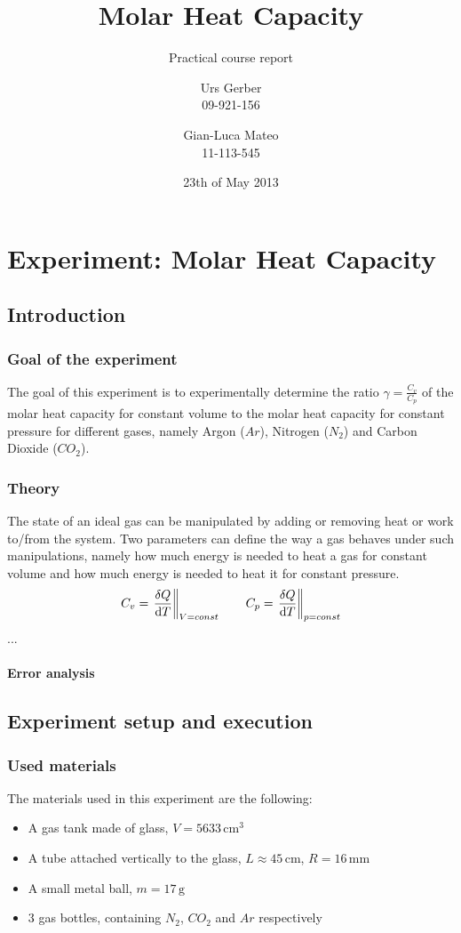 \documentclass{scrreprt}
\author{Urs Gerber\\09-921-156 \and Gian-Luca Mateo\\11-113-545}
\date{23th of May 2013}
\title{Molar Heat Capacity}
\subtitle{Practical course report}
\newcommand{\unit}[1]{\ensuremath{\, \mathrm{#1}}}
\begin{document}
\maketitle

\tableofcontents
\newpage

\chapter{Experiment: Molar Heat Capacity}
\section{Introduction}


\subsection{Goal of the experiment}
The goal of this experiment is to experimentally determine the ratio $\gamma = \frac{C_v}{C_p}$ of the molar heat capacity for constant volume to the molar heat capacity for constant pressure for different gases, namely Argon ($Ar$), Nitrogen ($N_2$) and Carbon Dioxide ($CO_2$). 
 
\subsection{Theory} 
The state of an ideal gas can be manipulated by adding or removing heat or work to/from the system. Two parameters can define the way a gas behaves under such manipulations, namely how much energy is needed to heat a gas for constant volume and how much energy is needed to heat it for constant pressure.
\begin{equation}
C_v = \left. \frac{\delta Q}{\dif{T}} \right\|_{V=const}
\qquad C_p = \left. \frac{\delta Q}{\dif{T}} \right\|_{p=const} 
\end{equation}
...
\
\subsubsection{Error analysis}


\section{Experiment setup and execution}

\subsection{Used materials}
The materials used in this experiment are the following:
\begin{itemize}
\item A gas tank made of glass, $V = 5633 \unit{cm^3}$
\item A tube attached vertically to the glass, $L \approx 45\unit{cm}$, $R = 16 \unit{mm}$
\item A small metal ball, $m = 17 \unit{g}$
\item 3 gas bottles, containing $N_2$, $CO_2$ and $Ar$ respectively
\end{itemize}
\end{document}
